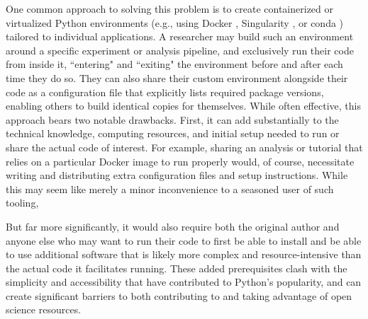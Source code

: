 \documentclass[preprint,12pt, a4paper]{elsarticle}
\begin{document}
One common approach to solving this problem is to create containerized or virtualized Python environments (e.g., using Docker \cite{Merk14}, Singularity \cite{KurtEtal17}, or conda \cite{Anac12}) tailored to individual applications.
A researcher may build such an environment around a specific experiment or analysis pipeline, and exclusively run their code from inside it, ``entering" and ``exiting" the environment before and after each time they do so.
They can also share their custom environment alongside their code as a configuration file that explicitly lists required package versions, enabling others to build identical copies for themselves.
While often effective, this approach bears two notable drawbacks.
First, it can add substantially to the technical knowledge, computing resources, and initial setup needed to run or share the actual code of interest.
For example, sharing an analysis or tutorial that relies on a particular Docker image to run properly would, of course, necessitate writing and distributing extra configuration files and setup instructions. While this may seem like merely a minor inconvenience to a seasoned user of such tooling,

But far more significantly, it would also require both the original author and anyone else who may want to run their code to first be able to install and be able to use additional software that is likely more complex and resource-intensive than the actual code it facilitates running.
These added prerequisites clash with the simplicity and accessibility that have contributed to Python's popularity, and can create significant barriers to both contributing to and taking advantage of open science resources.
\end{document}
